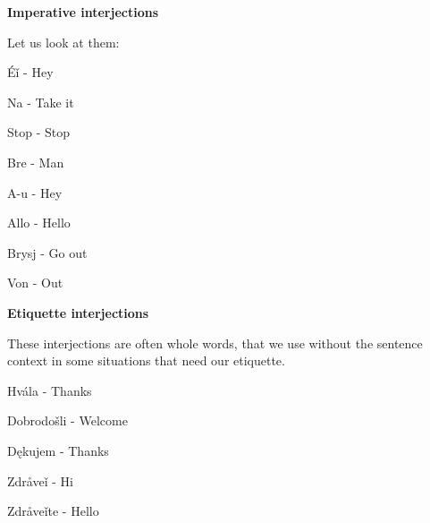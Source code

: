 \textbf{Imperative interjections}

Let us look at them:

Éǐ - Hey

Na - Take it

Stop - Stop

Bre - Man

A-u - Hey

Allo - Hello

Brysj - Go out

Von - Out

\textbf{Etiquette interjections}

These interjections are often whole words, that we use without the sentence context in some situations that need our etiquette.

Hvála - Thanks

Dobrodošli - Welcome

Dękujem - Thanks

Zdråveǐ - Hi

Zdråveǐte - Hello
